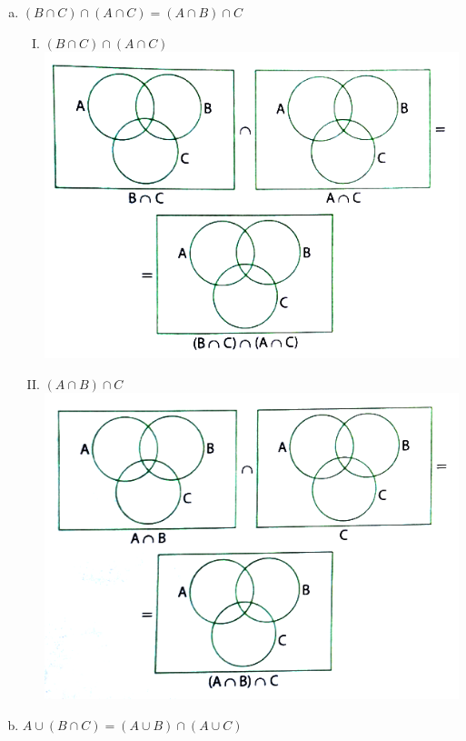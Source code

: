 \documentclass[a4paper,14pt]{article}
\begin{document}
\begin{multicols}{2}
\begin{enumerate}
\begin{enumerate}[a)]
\begin{enumerate}[I.]
    				\end{enumerate}
    				\item $(B \cap C) \cap (A \cap C) = (A \cap B) \cap C$
    				\begin{enumerate}[I.]
    					\item $(B \cap C) \cap (A \cap C)$ \\
    					\noindent\includegraphics[width=1.1\linewidth]{"6FMA54_imagens/imagem5"} \\
    					\item $(A \cap B) \cap C$ \\
    					\noindent\includegraphics[width=1.1\linewidth]{"6FMA54_imagens/imagem6"}
    				\end{enumerate}
    				\item $A \cup (B \cap C) = (A \cup B) \cap (A \cup C)$

\end{enumerate}
\end{enumerate}
\end{multicols}
\end{document}
